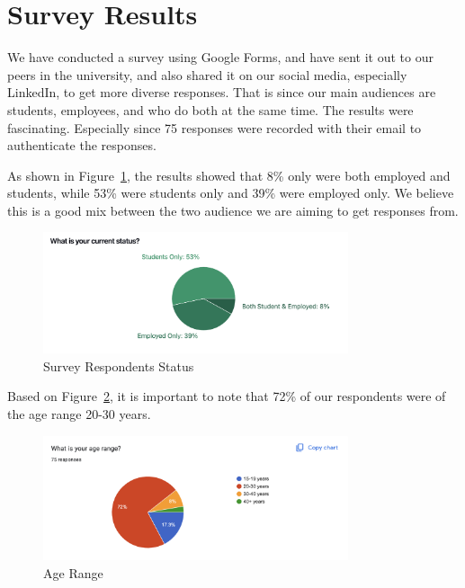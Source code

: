\documentclass[12pt,a4paper,twoside]{report}
\begin{document}
\section{Survey Results}

We have conducted a survey using Google Forms, and have sent it out to our peers in the university, and also shared it on our social media, especially LinkedIn, to get more diverse responses. That is since our main audiences are students, employees, and who do both at the same time. The results were fascinating. Especially since 75 responses were recorded with their email to authenticate the responses.

As shown in Figure~\ref{fig:survey-status}, the results showed that 8\% only were both employed and students, while 53\% were students only and 39\% were employed only. We believe this is a good mix between the two audience we are aiming to get responses from.

\begin{figure}[!h]
    \centering
    \includegraphics[width=0.8\textwidth]{images/survey/status.png}
    \caption{Survey Respondents Status}
    \label{fig:survey-status}
\end{figure}

Based on Figure~\ref{fig:age-range}, it is important to note that 72\% of our respondents were of the age range 20-30 years.

\begin{figure}[!h]
    \centering
    \includegraphics[width=0.8\textwidth]{images/survey/age.png}
    \caption{Age Range}
    \label{fig:age-range}
\end{figure}
\end{document}
